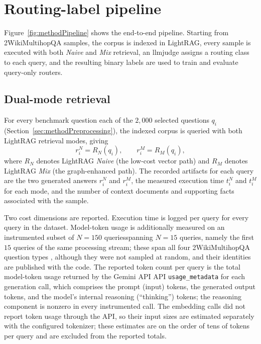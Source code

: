 \documentclass[english, bibtex]{kththesis}               %
\numberwithin{listing}{chapter}
\providecommand{\DIFaddtex}[1]{{\protect\color{blue} \sf #1}} %
\providecommand{\DIFdeltex}[1]{{\protect\color{red} \scriptsize #1}} %
\providecommand{\DIFaddbegin}{} %
\providecommand{\DIFaddend}{} %
\providecommand{\DIFdelbegin}{} %
\providecommand{\DIFdelend}{} %
\providecommand{\DIFadd}[1]{\texorpdfstring{\DIFaddtex{#1}}{#1}} %
\providecommand{\DIFdel}[1]{\texorpdfstring{\DIFdeltex{#1}}{}} %
\begin{document}
\DIFaddend \section{Routing-label pipeline}
\label{sec:methodPipeline}

Figure~\ref{fig:methodPipeline} shows the end-to-end pipeline. Starting from 2WikiMultihopQA samples, the corpus is indexed in LightRAG, every sample is executed with both \emph{Naive} and \emph{Mix} retrieval, an \gls{llmjudge} assigns a routing class to each query, and the resulting binary labels are used to train and evaluate query-only routers.

\subsection{Dual-mode retrieval}
\label{sec:methodDualMode}

For \DIFdelbegin \DIFdel{every benchmark question }\DIFdelend \DIFaddbegin \DIFadd{each of the $2{,}000$ selected questions }\DIFaddend \(q_i\) \DIFaddbegin \DIFadd{(Section~\ref{sec:methodPreprocessing})}\DIFaddend , the indexed corpus is queried with both LightRAG retrieval modes, giving
\begin{equation}
\label{eq:dualModeOutputs}
r_i^{N} = R_N(q_i),
\qquad
r_i^{M} = R_M(q_i),
\end{equation}
where \(R_N\) denotes LightRAG \emph{Naive} (the low-cost vector path) and \(R_M\) denotes LightRAG \emph{Mix} (the graph-enhanced path). The recorded artifacts for each query are the two generated answers \(r_i^N\) and \(r_i^M\), the measured execution time \(t_i^N\) and \(t_i^M\) for each mode, and the number of context documents and supporting facts associated with the sample.

Two cost dimensions are reported. Execution time is logged per query for every query in the dataset. Model-token usage is additionally measured on an instrumented subset of \DIFdelbegin \DIFdel{\(N = 150\) queriesspanning }\DIFdelend \DIFaddbegin \DIFadd{\(N = 15\) queries, namely the first $15$ queries of the same processing stream; these span }\DIFaddend all four 2WikiMultihopQA question types\DIFaddbegin \DIFadd{, although they were not sampled at random, and their identities are published with the code}\DIFaddend . The reported token count per query is the total model-token usage returned by the Gemini \DIFdelbegin \DIFdel{API }\DIFdelend \DIFaddbegin \DIFadd{\gls{API} }\DIFaddend \texttt{usage\_metadata} for each generation call, which comprises the prompt (input) tokens, the generated output tokens, and the model's internal reasoning (``thinking'') tokens; the reasoning component is nonzero in every instrumented call. The embedding calls did not report token usage through the API, so their input sizes are estimated separately with the configured tokenizer; these estimates are on the order of tens of tokens per query and are excluded from the reported totals.
\DIFaddbegin 
\end{document}
